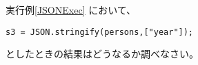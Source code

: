 \begin{Prob}\upshape\Must
 実行例\else\ref{JSONExec}\fi
 において、
\begin{Verbatim}
s3 = JSON.stringify(persons,["year"]);
\end{Verbatim}
としたときの結果はどうなるか調べなさい。
\end{Prob}
